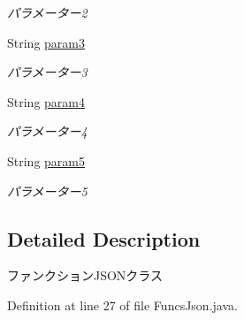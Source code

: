 \begin{DoxyCompactItemize}
\begin{DoxyCompactList}\small\item\em パラメーター2 \end{DoxyCompactList}\item 
\mbox{\label{classjp_1_1gr_1_1java__conf_1_1yuta__yoshinaga_1_1reversi_1_1model_1_1_funcs_json_a90c439852b243b45c68efe96ca46fa97}} 
String \mbox{\hyperlink{classjp_1_1gr_1_1java__conf_1_1yuta__yoshinaga_1_1reversi_1_1model_1_1_funcs_json_a90c439852b243b45c68efe96ca46fa97}{param3}}
\begin{DoxyCompactList}\small\item\em パラメーター3 \end{DoxyCompactList}\item 
\mbox{\label{classjp_1_1gr_1_1java__conf_1_1yuta__yoshinaga_1_1reversi_1_1model_1_1_funcs_json_a9656484f8db51bdace618bcdbc3497b9}} 
String \mbox{\hyperlink{classjp_1_1gr_1_1java__conf_1_1yuta__yoshinaga_1_1reversi_1_1model_1_1_funcs_json_a9656484f8db51bdace618bcdbc3497b9}{param4}}
\begin{DoxyCompactList}\small\item\em パラメーター4 \end{DoxyCompactList}\item 
\mbox{\label{classjp_1_1gr_1_1java__conf_1_1yuta__yoshinaga_1_1reversi_1_1model_1_1_funcs_json_ac1bb96b21d4b526a690a3c1a6a88d49b}} 
String \mbox{\hyperlink{classjp_1_1gr_1_1java__conf_1_1yuta__yoshinaga_1_1reversi_1_1model_1_1_funcs_json_ac1bb96b21d4b526a690a3c1a6a88d49b}{param5}}
\begin{DoxyCompactList}\small\item\em パラメーター5 \end{DoxyCompactList}\end{DoxyCompactItemize}


\subsection{Detailed Description}
ファンクション\+J\+S\+O\+Nクラス 

Definition at line 27 of file Funcs\+Json.\+java.



